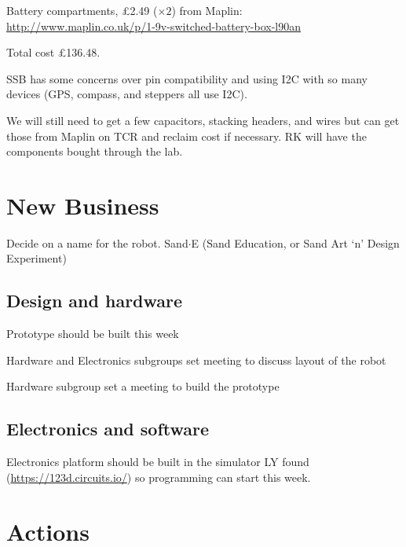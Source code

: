 \documentclass[a4paper,11pt,twoside,class=meetingmins,crop=false]{standalone}
\begin{document}
\begin{items}
    \item Battery compartments, \pounds{2.49} ($\times 2$) from Maplin:\\ \url{http://www.maplin.co.uk/p/1-9v-switched-battery-box-l90an}
    \item Total cost \pounds{136.48}.
    \item SSB has some concerns over pin compatibility and using I2C with so many devices (GPS, compass, and steppers all use I2C).
    \item We will still need to get a few capacitors, stacking headers, and wires but can get those from Maplin on TCR and reclaim cost if necessary.
    \decisions RK will have the components bought through the lab.
\end{items}

\section{New Business}
    \begin{items}
    \item Decide on a name for the robot.
    \decisions Sand$\cdot$E (Sand Education, or Sand Art `n' Design Experiment)

    \subsection{Design and hardware}
        \item Prototype should be built this week
        \begin{subitems}
            \item Hardware and Electronics subgroups set meeting to discuss layout of the robot
            \item Hardware subgroup set a meeting to build the prototype
        \end{subitems}
    \subsection{Electronics and software}
        \item Electronics platform should be built in the simulator LY found (\url{https://123d.circuits.io/}) so programming can start this week.         

\end{items}

\vspace{1em}
\vspace{1em}

\section{Actions}
\begin{items}
\end{items}
\end{document}
